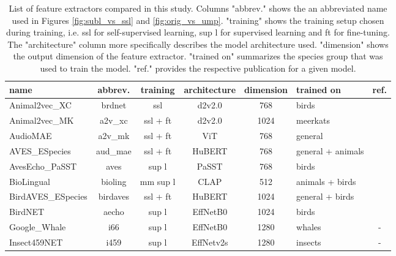 
\begin{table*}[t]
  
  \caption{List of feature extractors compared in this study. Columns "abbrev." shows the an abbreviated name used in Figures \ref{fig:subl_vs_ssl} and \ref{fig:orig_vs_ump}. "training" shows the training setup chosen during training, i.e. ssl for self-supervised learning, sup l for supervised learning and ft for fine-tuning. The "architecture" column more specifically describes the model architecture used. "dimension" shows the output dimension of the feature extractor. "trained on" summarizes the species group that was used to train the model. "ref." provides the respective publication for a given model. }
  \label{tab:bacpipe_models}
  \centering
  \begin{tabular}{|l|c|c|c|c|l|c|}
    \hline
    name& abbrev. & 
    training & architecture &
    dimension & trained on & ref.\\
    \hline
    Animal2vec\_XC      & brdnet   & ssl & d2v2.0 & 768 & birds & \cite{schafer-zimmermann_animal2vec_2024}\\
    Animal2vec\_MK      & a2v\_xc  & ssl + ft & d2v2.0 & 1024& meerkats & \cite{schafer-zimmermann_animal2vec_2024}\\
    AudioMAE            & a2v\_mk  & ssl + ft & ViT 	 & 768 & general & \cite{huang_masked_2022}\\
    AVES\_ESpecies      & aud\_mae   & ssl + ft & HuBERT 	 & 768 & general + animals & \cite{hagiwara_aves_2022}\\
    AvesEcho\_PaSST     & aves   & sup l & PaSST 	 & 768 & birds & \cite{ghani_generalization_2024}\\
    BioLingual          & bioling  & mm sup l & CLAP 	 & 512 & animals + birds & \cite{robinson_transferable_2023}\\
    BirdAVES\_ESpecies  & birdaves   & ssl + ft & HuBERT 	 & 1024& general + birds & \cite{hagiwara_aves_2022}\\
    BirdNET             & aecho   & sup l & EffNetB0 	 & 1024& birds & \cite{kahl_birdnet_2021}\\
    Google\_Whale       & i66   & sup l & EffNetB0 	 & 1280& whales & - \\
    Insect459NET        & i459 & sup l & EffNetv2s 	 & 1280& insects & - \\

\end{tabular}
\end{table*}

